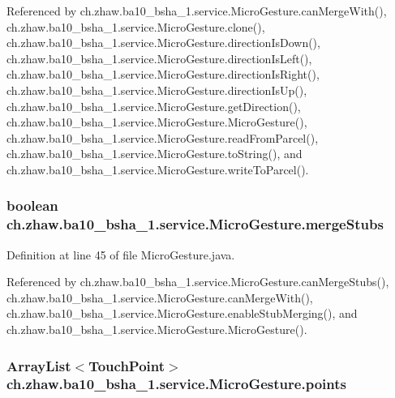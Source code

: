 Referenced by ch.zhaw.ba10\_\-bsha\_\-1.service.MicroGesture.canMergeWith(), ch.zhaw.ba10\_\-bsha\_\-1.service.MicroGesture.clone(), ch.zhaw.ba10\_\-bsha\_\-1.service.MicroGesture.directionIsDown(), ch.zhaw.ba10\_\-bsha\_\-1.service.MicroGesture.directionIsLeft(), ch.zhaw.ba10\_\-bsha\_\-1.service.MicroGesture.directionIsRight(), ch.zhaw.ba10\_\-bsha\_\-1.service.MicroGesture.directionIsUp(), ch.zhaw.ba10\_\-bsha\_\-1.service.MicroGesture.getDirection(), ch.zhaw.ba10\_\-bsha\_\-1.service.MicroGesture.MicroGesture(), ch.zhaw.ba10\_\-bsha\_\-1.service.MicroGesture.readFromParcel(), ch.zhaw.ba10\_\-bsha\_\-1.service.MicroGesture.toString(), and ch.zhaw.ba10\_\-bsha\_\-1.service.MicroGesture.writeToParcel().\hypertarget{classch_1_1zhaw_1_1ba10__bsha__1_1_1service_1_1MicroGesture_ad6fe6b70a61b144c8868ff32478d7d5a}{
\subsubsection[{mergeStubs}]{\setlength{\rightskip}{0pt plus 5cm}boolean {\bf ch.zhaw.ba10\_\-bsha\_\-1.service.MicroGesture.mergeStubs}}}
\label{classch_1_1zhaw_1_1ba10__bsha__1_1_1service_1_1MicroGesture_ad6fe6b70a61b144c8868ff32478d7d5a}


Definition at line 45 of file MicroGesture.java.

Referenced by ch.zhaw.ba10\_\-bsha\_\-1.service.MicroGesture.canMergeStubs(), ch.zhaw.ba10\_\-bsha\_\-1.service.MicroGesture.canMergeWith(), ch.zhaw.ba10\_\-bsha\_\-1.service.MicroGesture.enableStubMerging(), and ch.zhaw.ba10\_\-bsha\_\-1.service.MicroGesture.MicroGesture().\hypertarget{classch_1_1zhaw_1_1ba10__bsha__1_1_1service_1_1MicroGesture_a3eb0c61e8503400680d21d305ca58356}{
\subsubsection[{points}]{\setlength{\rightskip}{0pt plus 5cm}ArrayList$<${\bf TouchPoint}$>$ {\bf ch.zhaw.ba10\_\-bsha\_\-1.service.MicroGesture.points}}}
\label{classch_1_1zhaw_1_1ba10__bsha__1_1_1service_1_1MicroGesture_a3eb0c61e8503400680d21d305ca58356}



